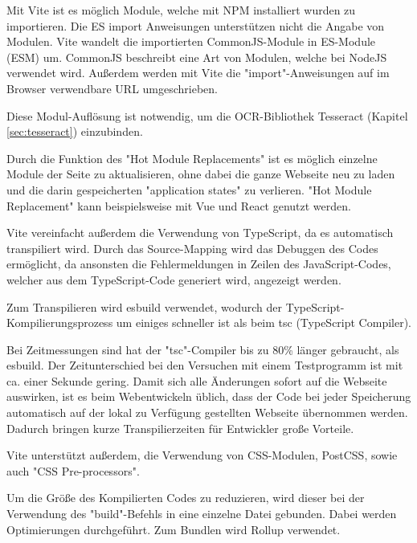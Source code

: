 

Mit Vite ist es möglich Module, welche mit NPM installiert wurden zu importieren. Die ES import Anweisungen unterstützen nicht die Angabe von Modulen. Vite wandelt die importierten CommonJS-Module in ES-Module (ESM) um. CommonJS beschreibt eine Art von Modulen, welche bei NodeJS verwendet wird. Außerdem werden mit Vite die "import"-Anweisungen auf im Browser verwendbare URL umgeschrieben. \cite{ViteFeatures}


Diese Modul-Auflösung ist notwendig, um die OCR-Bibliothek Tesseract (Kapitel \ref{sec:tesseract}) einzubinden. 


Durch die Funktion des "Hot Module Replacements" ist es möglich einzelne Module der Seite zu aktualisieren, ohne dabei die ganze Webseite neu zu laden und die darin gespeicherten "application states" zu verlieren. "Hot Module Replacement" kann beispielsweise mit Vue und React genutzt werden. \cite{ViteFeatures}
  

Vite vereinfacht außerdem die Verwendung von TypeScript, da es automatisch transpiliert wird. 
Durch das Source-Mapping wird das Debuggen des Codes ermöglicht, da ansonsten die Fehlermeldungen in Zeilen des JavaScript-Codes, welcher aus dem TypeScript-Code generiert wird, angezeigt werden. 

Zum Transpilieren wird esbuild\cite{esbuild} verwendet, wodurch der TypeScript-Kompilierungsprozess um einiges schneller ist als beim tsc (TypeScript Compiler). \cite{ViteFeatures}

Bei Zeitmessungen sind hat der "tsc"-Compiler bis zu 80\% länger gebraucht, als esbuild. Der Zeitunterschied bei den Versuchen mit einem Testprogramm ist mit ca. einer Sekunde gering. Damit sich alle Änderungen sofort auf die Webseite auswirken, ist es beim Webentwickeln üblich, dass der Code bei jeder Speicherung automatisch auf der lokal zu Verfügung gestellten Webseite übernommen werden. Dadurch bringen kurze Transpilierzeiten für Entwickler große Vorteile. 


Vite unterstützt außerdem, die Verwendung von CSS-Modulen, PostCSS, sowie auch "CSS Pre-processors". \cite{ViteFeatures}


Um die Größe des Kompilierten Codes zu reduzieren, wird dieser bei der Verwendung des "build"-Befehls in eine einzelne Datei gebunden. Dabei werden Optimierungen durchgeführt. Zum Bundlen wird Rollup \cite{Rollup} verwendet.



